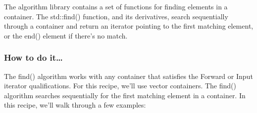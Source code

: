 
The algorithm library contains a set of functions for finding elements in a container.
The std::find() function, and its derivatives, search sequentially through a container and return an iterator pointing to the first matching element, or the end() element if there's no match.

\subsubsection{How to do it…}

The find() algorithm works with any container that satisfies the Forward or Input iterator qualifications. For this recipe, we'll use vector containers. The find() algorithm searches sequentially for the first matching element in a container. In this recipe, we'll walk through a few examples:

